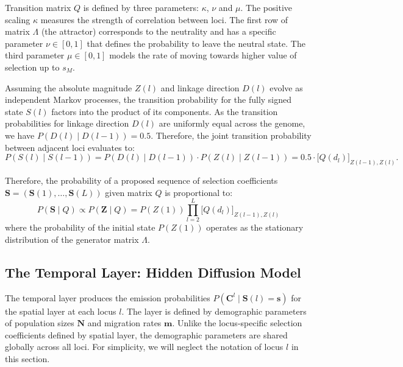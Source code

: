 \documentclass{article}
\begin{document}
Transition matrix $Q$ is defined by three parameters: $\kappa$, $\nu$ and $\mu$.
The positive scaling $\kappa$ measures the strength of correlation between loci.
The first row of matrix $\Lambda$ (the attractor) corresponds to the neutrality and has a specific parameter $\nu \in [0,1]$ that defines the probability to leave the neutral state.
The third parameter $\mu \in [0, 1]$ models the rate of moving towards higher value of selection up to $s_M$.

Assuming the absolute magnitude $Z(l)$ and linkage direction $D(l)$ evolve as independent Markov processes, the transition probability for the fully signed state $S(l)$ factors into the product of its components.
As the transition probabilities for linkage direction $ D(l) $ are uniformly equal across the genome, we have $ P(D(l) \mid D(l-1)) = 0.5 $.
Therefore, the joint transition probability between adjacent loci evaluates to:
$$ P(S(l) \mid S(l-1)) = P(D(l) \mid D(l-1)) \cdot P(Z(l) \mid Z(l-1)) = 0.5 \cdot \big[Q(d_l)\big]_{Z(l-1), Z(l)}.$$

Therefore, the probability of a proposed sequence of selection coefficients $ \mathbf{S} = (\mathbf{S}(1), \dots, \mathbf{S}(L)) $ given matrix $Q$ is proportional to:
\begin{equation}\label{eq:spatial_transition}
P(\mathbf{S} \mid Q) \propto P(\mathbf{Z} \mid Q) = P(Z(1)) \prod_{l=2}^L \big[Q(d_l)\big]_{Z(l-1), Z(l)}
\end{equation}
where the probability of the initial state $P(Z(1))$ operates as the stationary distribution of the generator matrix $ \Lambda $.



\subsection{The Temporal Layer: Hidden Diffusion Model}

The temporal layer produces the emission probabilities $P(\mathbf{C}^l \mid \mathbf{S}(l) = \mathbf{s})$ for the spatial layer at each locus $l$.
The layer is defined by demographic parameters of population sizes $\mathbf{N}$ and migration rates $\mathbf{m}$.
Unlike the locus-specific selection coefficients defined by spatial layer, the demographic parameters are shared globally across all loci.
For simplicity, we will neglect the notation of locus $l$ in this section.
\end{document}
